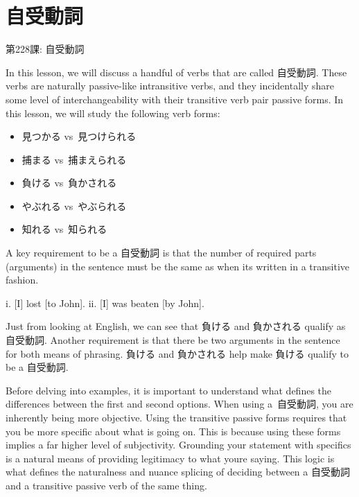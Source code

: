     
\chapter{自受動詞}

\begin{center}
\begin{Large}
第228課: 自受動詞 
\end{Large}
\end{center}
 
\par{ In this lesson, we will discuss a handful of verbs that are called 自受動詞. These verbs are naturally passive-like intransitive verbs, and they incidentally share some level of interchangeability with their transitive verb pair passive forms. In this lesson, we will study the following verb forms: }

\begin{itemize}

\item 見つかる vs 見つけられる \hfill\break

\item 捕まる vs 捕まえられる \hfill\break

\item 負ける vs 負かされる \hfill\break

\item やぶれる vs やぶられる \hfill\break

\item 知れる vs 知られる 
\end{itemize}

\par{ A key requirement to be a 自受動詞 is that the number of required parts (arguments) in the sentence must be the same as when it\textquotesingle s written in a transitive fashion. }

\par{i. [I] lost [to John]. \hfill\break
ii. [I] was beaten [by John]. }

\par{ Just from looking at English, we can see that 負ける and 負かされる qualify as 自受動詞. Another requirement is that there be two arguments in the sentence for both means of phrasing. 負ける and 負かされる help make 負ける qualify to be a 自受動詞. }

\par{ Before delving into examples, it is important to understand what defines the differences between the first and second options. When using a 自受動詞, you are inherently being more objective. Using the transitive passive forms requires that you be more specific about what is going on. This is because using these forms implies a far higher level of subjectivity. Grounding your statement with specifics is a natural means of providing legitimacy to what you\textquotesingle re saying. This logic is what defines the naturalness and nuance splicing of deciding between a 自受動詞 and a transitive passive verb of the same thing. }
      
